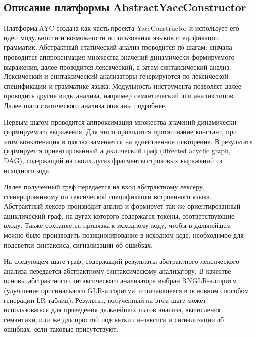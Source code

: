 \subsection{Описание платформы AbstractYaccConstructor}
Платформа AYC создана как часть проекта YaccConstructor и использует его идеи 
модульности и возможности использования языков спецификации грамматик. Абстрактный
статический анализ проводится по шагам: сначала проводится аппроксимация множества 
значений динамически формируемого выражения, далее проводится лексический, а затем
синтаксический анализ. Лексический и синтаксический анализаторы генерируются по 
лексической спецификации и грамматике языка. Модульность инструмента позволяет 
далее проводить другие виды анализа, например семантический или анализ типов. 
Далее шаги статического анализа описаны подробнее. 

Первым шагом проводится аппроксимация множества значений динамически формируемого 
выражения. Для этого проводится протягивание констант, при этом конкатенация в циклах 
заменяется на единственное повторение. В результате формируется ориентированный 
ациклический граф (directed acyclic graph, DAG), содержащий на своих дугах 
фрагменты строковых выражений из исходного кода. 

Далее полученный граф передается на вход абстрактному лексеру, сгенерированному 
по лексической спецификации встроенного языка. Абстрактный лексер производит 
анализ и формирует так же ориентированный ациклический граф, на дугах которого
содержатся токены, соответствующие входу. Также сохраняется привязка к исходному 
коду, чтобы в дальнейшем можно было производить позиционирование в исходном коде, 
необходимое для подсветки синтаксиса, сигнализации об ошибках. 

На следующем шаге граф, содержащий результаты абстрактного лексического анализа 
передается абстрактному синтаксическому анализатору. В качестве основы абстрактного 
синтаксического анализатора выбран RNGLR-алгоритм (улучшение оригинального GLR-алгоритма, 
отличающееся в основном способом генерации LR-таблиц). Результат, полученный на 
этом шаге может использоваться для проведения дальнейших шагов анализа, вычисления 
семантики, или же для простой подсветки синтаксиса и сигнализации об ошибках, 
если таковые присутствуют.

